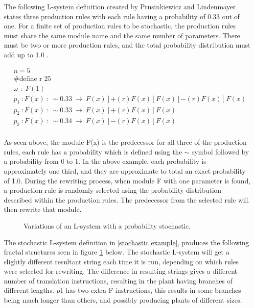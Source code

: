 The following L-system definition created by Prusinkiewicz and Lindenmayer states three production rules with each rule having a probability of 0.33 out of one. For a finite set of production rules to be stochastic, the production rules must share the same module name and the same number of parameters. There must be two or more production rules, and the total probability distribution must add up to 1.0 \cite{prusinkiewicz2012algorithmic}.

\begin{equation} \label{stochastic example}
\begin{aligned}
	&n=5\\
	&\text{\#define r 25}\\
	&\omega~~ :~ F(1)\\
	&p_1~ :  F(x)~ :~ \sim 0.33 ~ \rightarrow~ F(x)[+(r)F(x)]F(x)[-(r)F(x)]F(x)\\
	&p_2~ :  F(x)~ :~ \sim 0.33 ~ \rightarrow~ F(x)[+(r)F(x)]F(x)\\
	&p_3~ :  F(x)~ :~ \sim 0.34 ~ \rightarrow~ F(x)[-(r)F(x)]F(x)\\
\end{aligned}
\end{equation}

\noindent
As seen above, the module F(x) is the predecessor for all three of the production rules, each rule has a probability which is defined using the $\sim$ symbol followed by a probability from 0 to  1. In the above example, each probability is approximately one third, and they are approximate to total an exact probability of 1.0. During the rewriting process, when module F with one parameter is found, a production rule is randomly selected using the probability distribution described within the production rules. The predecessor from the selected rule will then rewrite that module.

\begin{figure}[htbp]
	{\centering
		\vspace{7px}
		\setlength{\fboxrule}{1pt}
		\caption{Variations of an L-system with a probability stochastic.} \label{stochastic diagram}
	}
\end{figure}
\FloatBarrier

\newpage
\noindent
The stochastic L-system definition in \ref{stochastic example}, produces the following fractal structures seen in figure \ref{stochastic diagram} below. The stochastic L-system will get a slightly different resultant string each time it is run, depending on which rules were selected for rewriting. The difference in resulting strings gives a different number of translation instructions, resulting in the plant having branches of different lengths. $p1$ has two extra F instructions, this results in some branches being much longer than others, and possibly producing plants of different sizes. 

